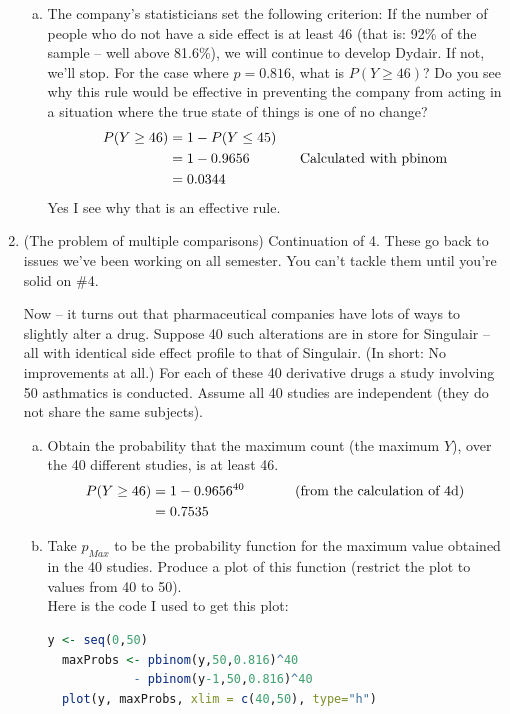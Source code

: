 \documentclass{scrartcl}
\begin{document}
\begin{enumerate}
\begin{enumerate}[a)]
\item The company's statisticians set the following criterion: If the number of people who do not have a side effect is at least 46 (that is: 92\% of the sample – well above 81.6\%), we will continue to develop Dydair. If not, we'll stop. For the case where $p = 0.816$, what is $P(Y \ge 46)$? Do you see why this rule would be effective in preventing the company from acting in a situation where the true state of things is one of no change?\\
\begin{align*}
  P(Y\ge46) &= 1 - P(Y\le45)\\
            &= 1 - 0.9656 \text{\hspace{0.5in}Calculated with pbinom}\\
            &= 0.0344
\end{align*}
Yes I see why that is an effective rule.

\end{enumerate}

\item (The problem of multiple comparisons) Continuation of 4. These go back to issues we’ve been working on all semester. You can’t tackle them until you’re solid on \#4.

Now – it turns out that pharmaceutical companies have lots of ways to slightly alter a drug. Suppose 40 such alterations are in store for Singulair – all with identical side effect profile to that of Singulair. (In short: No improvements at all.) For each of these 40 derivative drugs a study involving 50 asthmatics is conducted. Assume all 40 studies are independent (they do not share the same subjects).

\begin{enumerate}[a)]
\item Obtain the probability that the maximum count (the maximum $Y$), over the 40 different studies, is at least 46.\\

\begin{align*}
  P(Y\ge46) &= 1 - 0.9656^{40} \text{\hspace{0.5in}(from the calculation of 4d)}\\
            &= 0.7535
\end{align*}

\item Take $p_{Max}$ to be the probability function for the maximum value obtained in the 40 studies. Produce a plot of this function (restrict the plot to values from 40 to 50).\\
Here is the code I used to get this plot:
\begin{lstlisting}[language=R]
  y <- seq(0,50)
  maxProbs <- pbinom(y,50,0.816)^40
            - pbinom(y-1,50,0.816)^40
  plot(y, maxProbs, xlim = c(40,50), type="h")
\end{lstlisting}


\end{enumerate}
\end{enumerate}
\end{document}
